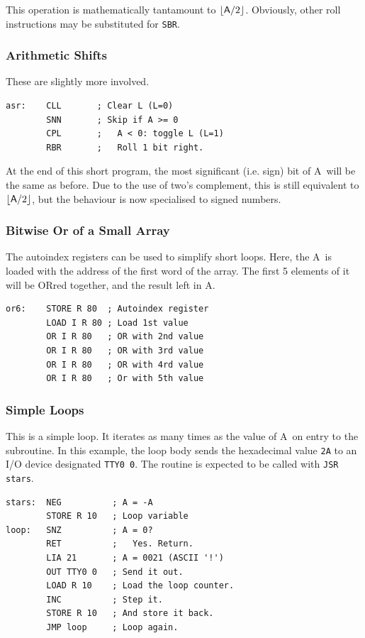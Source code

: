\documentclass[11pt,a4paper,twocolumns]{article}
\newcommand\register[1]{\textsf{#1}}
\newcommand\A{\register{A}}
\begin{document}
This operation is mathematically tantamount to
$\lfloor\mbox{\A}/2\rfloor$. Obviously, other roll instructions may be
substituted for {\tt SBR}.

\subsubsection{Arithmetic Shifts}

These are slightly more involved.

\begin{verbatim}
asr:    CLL       ; Clear L (L=0)
        SNN       ; Skip if A >= 0
        CPL       ;   A < 0: toggle L (L=1)
        RBR       ;   Roll 1 bit right.
\end{verbatim}

At the end of this short program, the most significant (i.e. sign) bit
of \A\ will be the same as before. Due to the use of two's complement,
this is still equivalent to $\lfloor\mbox{\A}/2\rfloor$, but the
behaviour is now specialised to signed numbers.

\subsubsection{Bitwise Or of a Small Array}

The autoindex registers can be used to simplify short loops. Here, the
\A\ is loaded with the address of the first word of the array. The
first 5 elements of it will be ORred together, and the result left in
\A.

\begin{verbatim}
or6:    STORE R 80  ; Autoindex register
        LOAD I R 80 ; Load 1st value
        OR I R 80   ; OR with 2nd value
        OR I R 80   ; OR with 3rd value
        OR I R 80   ; OR with 4rd value
        OR I R 80   ; Or with 5th value
\end{verbatim}

\subsubsection{Simple Loops}

This is a simple loop. It iterates as many times as the value of
\A\ on entry to the subroutine. In this example, the loop body sends
the hexadecimal value {\tt 2A} to an I/O device designated {\tt TTY0
  0}. The routine is expected to be called with {\tt JSR stars}.

\begin{verbatim}
stars:  NEG          ; A = -A
        STORE R 10   ; Loop variable
loop:   SNZ          ; A = 0?
        RET          ;   Yes. Return.
        LIA 21       ; A = 0021 (ASCII '!')
        OUT TTY0 0   ; Send it out.
        LOAD R 10    ; Load the loop counter.
        INC          ; Step it.
        STORE R 10   ; And store it back.
        JMP loop     ; Loop again.
\end{verbatim}
\end{document}
